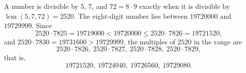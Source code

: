 A number is divisible by $5$, $7$, and $72=8\cdot9$ exactly when it is divisible by $\operatorname{lcm}(5,7,72)=2520$. The eight-digit number lies between $19720000$ and $19729999$. Since
\[
2520\cdot7825=19719000<19720000\le 2520\cdot7826=19721520,
\]
and $2520\cdot7830=19731600>19729999$, the multiples of $2520$ in the range are
\[
2520\cdot7826,\ 2520\cdot7827,\ 2520\cdot7828,\ 2520\cdot7829,
\]
that is,
\[\boxed{19721520,\ 19724040,\ 19726560,\ 19729080}.\]
